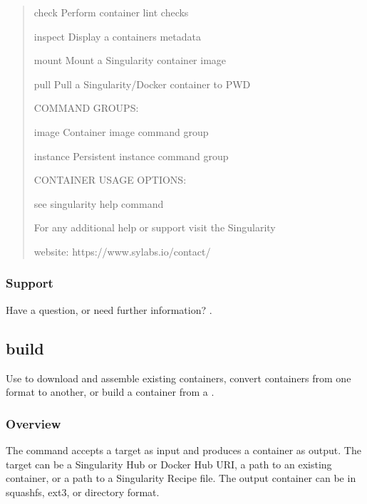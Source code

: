 \documentclass[letterpaper,10pt,english]{sphinxmanual}
\begin{document}
\begin{quote}
\begin{sphinxVerbatim}[commandchars=\\\{\}]
    check      Perform container lint checks

    inspect    Display a container\PYGZsq{}s metadata

    mount      Mount a Singularity container image

    pull       Pull a Singularity/Docker container to \PYGZdl{}PWD


COMMAND GROUPS:

    image      Container image command group

    instance   Persistent instance command group



CONTAINER USAGE OPTIONS:

    see singularity help \PYGZlt{}command\PYGZgt{}


For any additional help or support visit the Singularity

website: https://www.sylabs.io/contact/
\end{sphinxVerbatim}
\end{quote}


\subsubsection{Support}
\label{\detokenize{appendix:support}}
Have a question, or need further information? .


\subsection{build}
\label{\detokenize{appendix:id23}}\label{\detokenize{appendix:id24}}\label{\detokenize{appendix:sec-build}}
Use  to download and assemble existing containers, convert containers
from one format to another, or build a container from a .


\subsubsection{Overview}
\label{\detokenize{appendix:id25}}
The  command accepts a target as input and produces a container as
output. The target can be a Singularity Hub or Docker Hub URI, a path
to an existing container, or a path to a Singularity Recipe file. The
output container can be in squashfs, ext3, or directory format.
\end{document}
